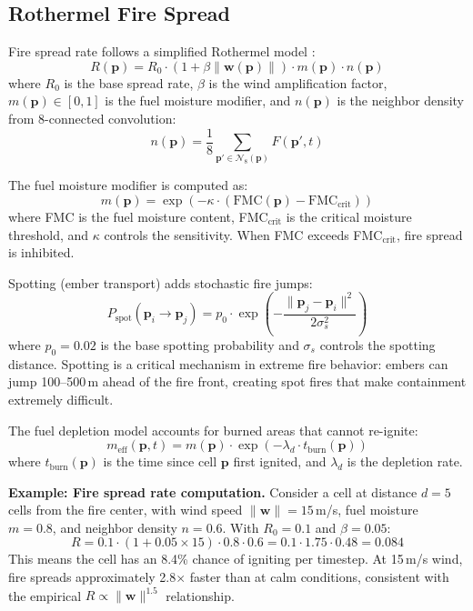 \documentclass[12pt,a4paper]{article}
\DeclareRobustCommand{\cN}{\mathcal{N}}
\DeclareRobustCommand{\vect}[1]{\bm{#1}}
\begin{document}
\subsection{Rothermel Fire Spread}

Fire spread rate follows a simplified Rothermel model \cite{Holland2010}:
\begin{equation}
    R(\vect{p}) = R_0 \cdot (1 + \beta \|\vect{w}(\vect{p})\|) \cdot m(\vect{p}) \cdot n(\vect{p})
    \label{eq:spread}
\end{equation}
where $R_0$ is the base spread rate, $\beta$ is the wind amplification factor, $m(\vect{p}) \in [0, 1]$ is the fuel moisture modifier, and $n(\vect{p})$ is the neighbor density from 8-connected convolution:
\begin{equation}
    n(\vect{p}) = \frac{1}{8}\sum_{\vect{p}' \in \cN_8(\vect{p})} F(\vect{p}', t)
\end{equation}

The fuel moisture modifier is computed as:
\begin{equation}
    m(\vect{p}) = \exp\left(-\kappa \cdot (\text{FMC}(\vect{p}) - \text{FMC}_{\text{crit}})\right)
\end{equation}
where FMC is the fuel moisture content, FMC$_{\text{crit}}$ is the critical moisture threshold, and $\kappa$ controls the sensitivity. When FMC exceeds FMC$_{\text{crit}}$, fire spread is inhibited.

Spotting (ember transport) adds stochastic fire jumps:
\begin{equation}
    P_{\text{spot}}(\vect{p}_i \to \vect{p}_j) = p_0 \cdot \exp\left(-\frac{\|\vect{p}_j - \vect{p}_i\|^2}{2\sigma_s^2}\right)
\end{equation}
where $p_0 = 0.02$ is the base spotting probability and $\sigma_s$ controls the spotting distance. Spotting is a critical mechanism in extreme fire behavior: embers can jump 100--500\,m ahead of the fire front, creating spot fires that make containment extremely difficult.

The fuel depletion model accounts for burned areas that cannot re-ignite:
\begin{equation}
    m_{\text{eff}}(\vect{p}, t) = m(\vect{p}) \cdot \exp(-\lambda_d \cdot t_{\text{burn}}(\vect{p}))
\end{equation}
where $t_{\text{burn}}(\vect{p})$ is the time since cell $\vect{p}$ first ignited, and $\lambda_d$ is the depletion rate.

\textbf{Example: Fire spread rate computation.} Consider a cell at distance $d = 5$ cells from the fire center, with wind speed $\|\vect{w}\| = 15$\,m/s, fuel moisture $m = 0.8$, and neighbor density $n = 0.6$. With $R_0 = 0.1$ and $\beta = 0.05$:
\begin{equation}
    R = 0.1 \cdot (1 + 0.05 \times 15) \cdot 0.8 \cdot 0.6 = 0.1 \cdot 1.75 \cdot 0.48 = 0.084
\end{equation}
This means the cell has an 8.4\% chance of igniting per timestep. At 15\,m/s wind, fire spreads approximately 2.8$\times$ faster than at calm conditions, consistent with the empirical $R \propto \|\vect{w}\|^{1.5}$ relationship.
\end{document}
